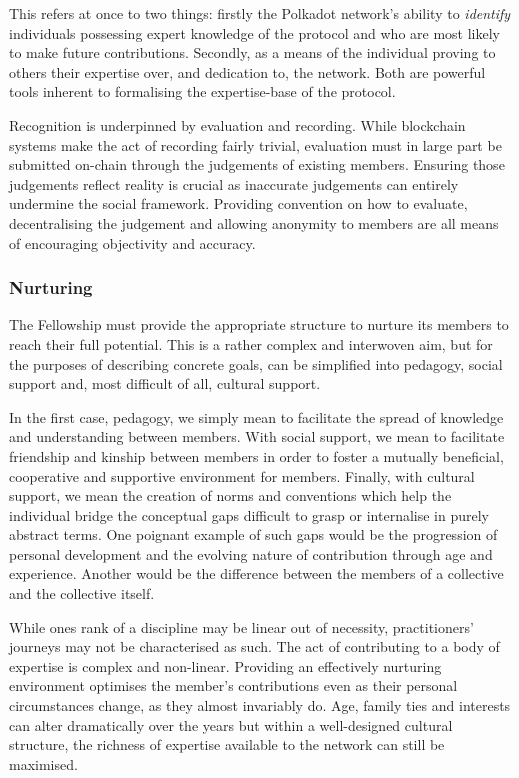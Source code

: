 \documentclass[9pt,oneside]{amsart}
\begin{document}
This refers at once to two things: firstly the Polkadot network's ability to \emph{identify} individuals possessing expert knowledge of the protocol and who are most likely to make future contributions. Secondly, as a means of the individual proving to others their expertise over, and dedication to, the network. Both are powerful tools inherent to formalising the expertise-base of the protocol.

Recognition is underpinned by evaluation and recording. While blockchain systems make the act of recording fairly trivial, evaluation must in large part be submitted on-chain through the judgements of existing members. Ensuring those judgements reflect reality is crucial as inaccurate judgements can entirely undermine the social framework. Providing convention on how to evaluate, decentralising the judgement and allowing anonymity to members are all means of encouraging objectivity and accuracy.

\subsubsection{Nurturing}

The Fellowship must provide the appropriate structure to nurture its members to reach their full potential. This is a rather complex and interwoven aim, but for the purposes of describing concrete goals, can be simplified into pedagogy, social support and, most difficult of all, cultural support.

In the first case, pedagogy, we simply mean to facilitate the spread of knowledge and understanding between members. With social support, we mean to facilitate friendship and kinship between members in order to foster a mutually beneficial, cooperative and supportive environment for members. Finally, with cultural support, we mean the creation of norms and conventions which help the individual bridge the conceptual gaps difficult to grasp or internalise in purely abstract terms. One poignant example of such gaps would be the progression of personal development and the evolving nature of contribution through age and experience. Another would be the difference between the members of a collective and the collective itself.

While ones rank of a discipline may be linear out of necessity, practitioners' journeys may not be  characterised as such. The act of contributing to a body of expertise is complex and non-linear. Providing an effectively nurturing environment optimises the member's contributions even as their personal circumstances change, as they almost invariably do. Age, family ties and interests can alter dramatically over the years but within a well-designed cultural structure, the richness of expertise available to the network can still be maximised.
\end{document}
